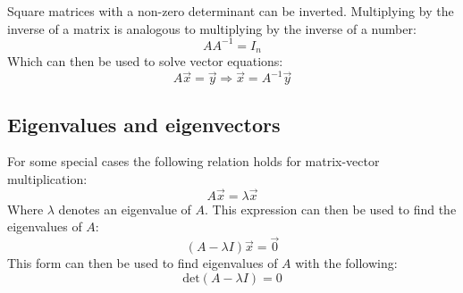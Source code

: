 \documentclass[11pt, a4paper]{article}
\begin{document}
Square matrices with a non-zero determinant can be inverted. Multiplying by the inverse of a matrix is analogous to multiplying by the inverse of a number:
\begin{equation*}
  AA^{-1} = I_n
\end{equation*}
Which can then be used to solve vector equations:
\begin{equation*}
  A\vec{x} = \vec{y} \Rightarrow \vec{x} = A^{-1}\vec{y}
\end{equation*}


\subsection{Eigenvalues and eigenvectors}
For some special cases the following relation holds for matrix-vector multiplication:
\begin{equation*}
  A\vec{x} = \lambda\vec{x}
\end{equation*}
Where $\lambda$ denotes an eigenvalue of $A$. This expression can then be used to find the eigenvalues of $A$:
\begin{equation*}
  (A - \lambda I)\vec{x} = \vec{0}
\end{equation*}
This form can then be used to find eigenvalues of $A$ with the following:
\begin{equation*}
  \text{det}(A-\lambda I) = 0
\end{equation*}
\end{document}
